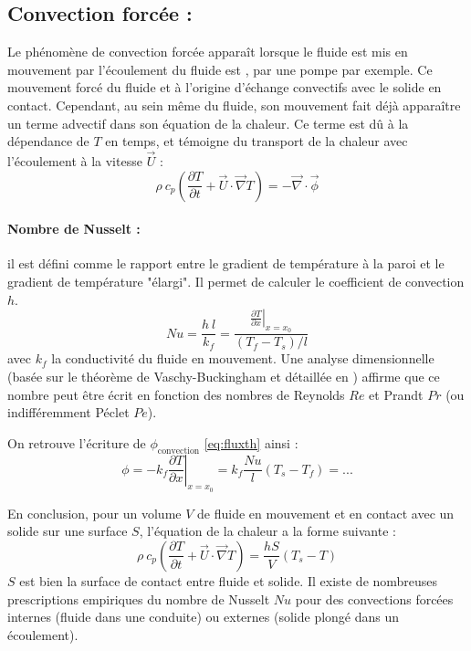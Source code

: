 \subsection{Convection forcée :}
Le phénomène de convection forcée apparaît lorsque le fluide est mis en mouvement par
l'écoulement du fluide est , par une pompe par exemple. Ce mouvement forcé du fluide et à l'origine d'échange convectifs avec le solide en contact. Cependant, au sein même du fluide, son mouvement fait déjà apparaître un terme advectif dans son équation de la chaleur. Ce terme est dû à la dépendance de $T$ en temps, et témoigne du transport de la chaleur avec l'écoulement à la vitesse $\vec{U}$ :
%
\begin{equation}
    \rho~c_{p} \left( \frac{\partial T}{\partial t}
    + \vec{U} \cdot \vec{\nabla} T \right)
    = - \vec{\nabla} \cdot \vec{\phi}
\end{equation}

\paragraph{Nombre de Nusselt :}il est défini comme le rapport entre le gradient de température à la paroi et le gradient de température "élargi". Il permet de calculer le coefficient de convection $h$.
%
\begin{equation}
    Nu = \frac{h~l}{k_f}
       = \frac{\left. \frac{\partial{T}}{\partial{x}} \right|_{x=x_0}}
              {\left( T_f - T_s \right)/l}
\end{equation}
%
avec $k_f$ la conductivité du fluide en mouvement. Une analyse dimensionnelle (basée sur le théorème de Vaschy-Buckingham et détaillée en \cite{battaglia2010introduction}) affirme que ce nombre peut être écrit en fonction des nombres de Reynolds $Re$ et Prandt $Pr$ (ou indifféremment Péclet $Pe$).

On retrouve l'écriture de $\phi_{\text{convection}}$ \eqref{eq:fluxth} ainsi :
%
\begin{equation}
    \phi = - k_f \left. \frac{\partial{T}}{\partial{x}} \right|_{x=x_0}
         = k_f \frac{Nu}{l} \left( T_s - T_f \right)
         = ...
\end{equation}

En conclusion, pour un volume $V$ de fluide en mouvement et en contact avec un solide sur une surface $S$, l'équation de la chaleur a la forme suivante :
%
\begin{equation}
    \rho~c_p \left( \frac{\partial T}{\partial t}
    + \vec{U} \cdot \vec{\nabla} T \right)
    = \frac{h S}{V} \left( T_s - T \right)
\end{equation}
%
$S$ est bien la surface de contact entre fluide et solide. Il existe de nombreuses prescriptions empiriques du nombre de Nusselt $Nu$ pour des convections forcées internes (fluide dans une conduite) ou externes (solide plongé dans un écoulement).


